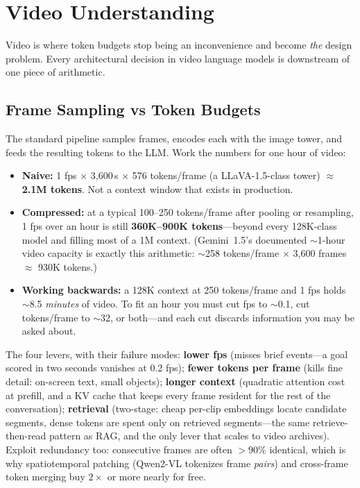 \section{Video Understanding}
\label{sec:video_understanding}

Video is where token budgets stop being an inconvenience and become \textit{the} design problem. Every architectural decision in video language models is downstream of one piece of arithmetic.

\subsection{Frame Sampling vs Token Budgets}

The standard pipeline samples frames, encodes each with the image tower, and feeds the resulting tokens to the LLM. Work the numbers for one hour of video:

\begin{itemize}
    \item \textbf{Naive:} 1 fps $\times$ 3{,}600\,s $\times$ 576 tokens/frame (a LLaVA-1.5-class tower) $\approx$ \textbf{2.1M tokens}. Not a context window that exists in production.
    \item \textbf{Compressed:} at a typical 100--250 tokens/frame after pooling or resampling, 1 fps over an hour is still \textbf{360K--900K tokens}---beyond every 128K-class model and filling most of a 1M context. (Gemini~1.5's documented $\sim$1-hour video capacity is exactly this arithmetic: $\sim$258 tokens/frame $\times$ 3{,}600 frames $\approx$ 930K tokens.)
    \item \textbf{Working backwards:} a 128K context at 250 tokens/frame and 1 fps holds $\sim$8.5 \textit{minutes} of video. To fit an hour you must cut fps to $\sim$0.1, cut tokens/frame to $\sim$32, or both---and each cut discards information you may be asked about.
\end{itemize}

The four levers, with their failure modes: \textbf{lower fps} (misses brief events---a goal scored in two seconds vanishes at 0.2 fps); \textbf{fewer tokens per frame} (kills fine detail: on-screen text, small objects); \textbf{longer context} (quadratic attention cost at prefill, and a KV cache that keeps every frame resident for the rest of the conversation); \textbf{retrieval} (two-stage: cheap per-clip embeddings locate candidate segments, dense tokens are spent only on retrieved segments---the same retrieve-then-read pattern as RAG, and the only lever that scales to video archives). Exploit redundancy too: consecutive frames are often $>$90\% identical, which is why spatiotemporal patching (Qwen2-VL tokenizes frame \textit{pairs}) and cross-frame token merging buy $2\times$ or more nearly for free.

